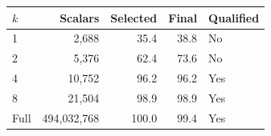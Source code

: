 \begin{tabular}{lrrrl}
\toprule
$k$ & Scalars & Selected & Final & Qualified \\
\midrule
1 & 2,688 & 35.4 & 38.8 & No \\
2 & 5,376 & 62.4 & 73.6 & No \\
4 & 10,752 & 96.2 & 96.2 & Yes \\
8 & 21,504 & 98.9 & 98.9 & Yes \\
Full & 494,032,768 & 100.0 & 99.4 & Yes \\
\bottomrule
\end{tabular}
